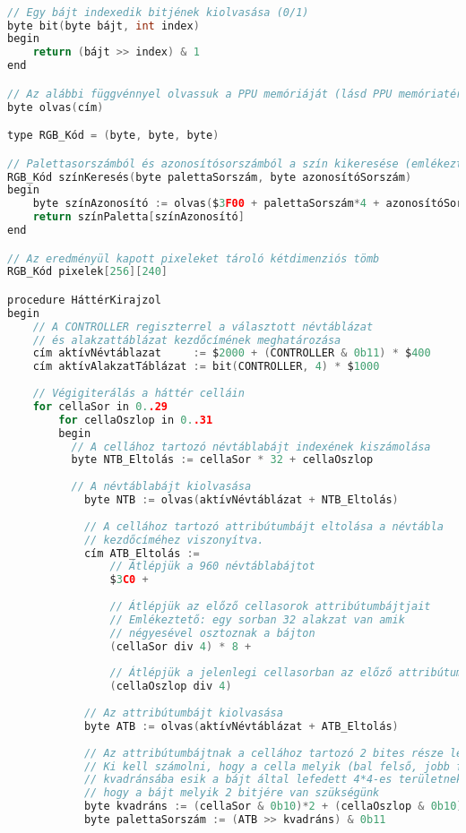 \begin{lstlisting}[backgroundcolor = \color{white}, language=c, basicstyle=\scriptsize]

// Egy bájt indexedik bitjének kiolvasása (0/1)
byte bit(byte bájt, int index)
begin
	return (bájt >> index) & 1
end

// Az alábbi függvénnyel olvassuk a PPU memóriáját (lásd PPU memóriatérkép)
byte olvas(cím)

type RGB_Kód = (byte, byte, byte)

// Palettasorszámból és azonosítósorszámból a szín kikeresése (emlékeztető: $3F00 a paletta index kezdőcíme)
RGB_Kód színKeresés(byte palettaSorszám, byte azonosítóSorszám)
begin
	byte színAzonosító := olvas($3F00 + palettaSorszám*4 + azonosítóSorszám)
	return színPaletta[színAzonosító]
end

// Az eredményül kapott pixeleket tároló kétdimenziós tömb
RGB_Kód pixelek[256][240]

procedure HáttérKirajzol
begin
	// A CONTROLLER regiszterrel a választott névtáblázat
	// és alakzattáblázat kezdőcímének meghatározása
	cím aktívNévtáblazat     := $2000 + (CONTROLLER & 0b11) * $400
	cím aktívAlakzatTáblázat := bit(CONTROLLER, 4) * $1000
	
	// Végigiterálás a háttér celláin
	for cellaSor in 0..29
		for cellaOszlop in 0..31
		begin
		  // A cellához tartozó névtáblabájt indexének kiszámolása
		  byte NTB_Eltolás := cellaSor * 32 + cellaOszlop 
		  
		  // A névtáblabájt kiolvasása
			byte NTB := olvas(aktívNévtáblázat + NTB_Eltolás)
			
			// A cellához tartozó attribútumbájt eltolása a névtábla
			// kezdőcíméhez viszonyítva.
			cím ATB_Eltolás := 
				// Átlépjük a 960 névtáblabájtot 
				$3C0 +		
								
				// Átlépjük az előző cellasorok attribútumbájtjait
				// Emlékeztető: egy sorban 32 alakzat van amik 
				// négyesével osztoznak a bájton
				(cellaSor div 4) * 8 + 	
					
				// Átlépjük a jelenlegi cellasorban az előző attribútumbájtokat
				(cellaOszlop div 4)         
				
			// Az attribútumbájt kiolvasása
			byte ATB := olvas(aktívNévtáblázat + ATB_Eltolás)
			
			// Az attribútumbájtnak a cellához tartozó 2 bites része lesz a palettasorszám.
			// Ki kell számolni, hogy a cella melyik (bal felső, jobb felső, stb.)
			// kvadránsába esik a bájt által lefedett 4*4-es területnek, ugyanis így kapjuk meg,
			// hogy a bájt melyik 2 bitjére van szükségünk
			byte kvadráns := (cellaSor & 0b10)*2 + (cellaOszlop & 0b10) 
			byte palettaSorszám := (ATB >> kvadráns) & 0b11
				

\end{lstlisting}
